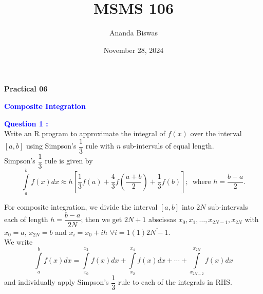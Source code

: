 \documentclass[11pt, a4paper]{article}\usepackage[]{graphicx}\usepackage[]{xcolor}
\title{MSMS 106}
\author{Ananda Biswas}
\date{November 28, 2024}
\begin{document}
\maketitle

\begin{center}
\textbf{Practical 06}
\end{center}

 \hspace{0.2cm} \textcolor{blue}{\textbf{Composite Integration}}

\vspace{0.5cm}

\smallpencil \hspace{0.2cm} \textcolor{blue}{\textbf{Question 1 : }} \\

\hspace{1cm} Write an R program to approximate the integral of $f(x)$ over the interval $[a, b]$ using Simpson's $\dfrac{1}{3}$ rule with $n$ sub-intervals of equal length. \\

\faArrowAltCircleRight[regular] \hspace{0.2cm} Simpson's $\dfrac{1}{3}$ rule is given by $$\int \limits_{a}^{b} f(x) dx \approx h \left[ \dfrac{1}{3} f(a) + \dfrac{4}{3} f\left(\dfrac{a+b}{2}\right) + \dfrac{1}{3} f(b) \right]; \,\,\, \text{where } h = \dfrac{b-a}{2}. $$

For composite integration, we divide the interval $[a, b]$ into $2N$ sub-intervals each of length $h = \dfrac{b-a}{2N}$; then we get $2N + 1$ abscissas $x_0, x_1, \ldots, x_{2N-1}, x_{2N}$ with $x_0 = a$, $x_{2N} = b$ and $x_i = x_0 + ih \,\, \forall i = 1(1)\overline{2N-1}$. \\

We write $$\int \limits_{a}^{b} f(x) dx = \int \limits_{x_0}^{x_2} f(x) dx + \int \limits_{x_2}^{x_4} f(x) dx + \cdots + \int \limits_{x_{2N-2}}^{x_{2N}} f(x) dx$$ and individually apply Simpson's $\dfrac{1}{3}$ rule to each of the integrals in RHS.
\end{document}
